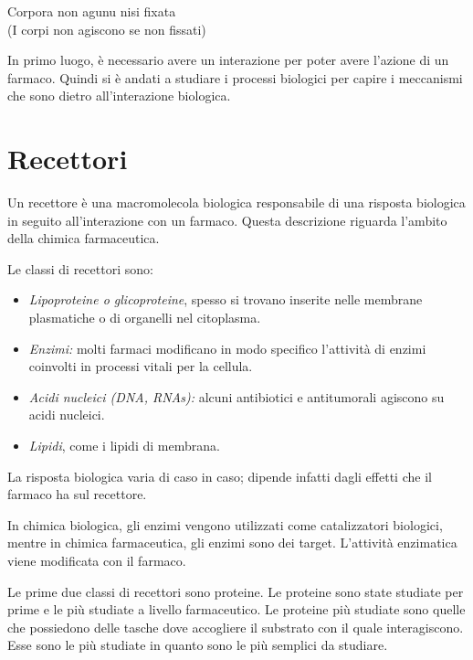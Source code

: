 \begin{quoting}
Corpora non agunu nisi fixata\\
(I corpi non agiscono se non fissati)\par
{}
\end{quoting}

In primo luogo, è necessario avere un interazione per poter avere
l'azione di un farmaco. Quindi si è andati a studiare i processi
biologici per capire i meccanismi che sono dietro all'interazione
biologica.

\section{Recettori}

Un recettore è una macromolecola biologica responsabile di una risposta
biologica in seguito all'interazione con un farmaco. Questa descrizione
riguarda l'ambito della chimica farmaceutica.


Le classi di recettori sono:
\begin{itemize}
\item
  \emph{Lipoproteine o glicoproteine}, spesso si trovano inserite nelle
  membrane plasmatiche o di organelli nel citoplasma.
\item
  \emph{Enzimi:} molti farmaci modificano in modo specifico l'attività
  di enzimi coinvolti in processi vitali per la cellula.
\item
  \emph{Acidi nucleici (DNA, RNAs):} alcuni antibiotici e antitumorali
  agiscono su acidi nucleici.
\item
  \emph{Lipidi}, come i lipidi di membrana.
\end{itemize}

La risposta biologica varia di caso in caso; dipende infatti dagli
effetti che il farmaco ha sul recettore.

In chimica biologica, gli enzimi vengono utilizzati come catalizzatori
biologici, mentre in chimica farmaceutica, gli enzimi sono dei target.
L'attività enzimatica viene modificata con il farmaco.

Le prime due classi di recettori sono proteine. Le proteine sono state
studiate per prime e le più studiate a livello farmaceutico. Le proteine
più studiate sono quelle che possiedono delle tasche dove accogliere il
substrato con il quale interagiscono. Esse sono le più studiate in
quanto sono le più semplici da studiare.

